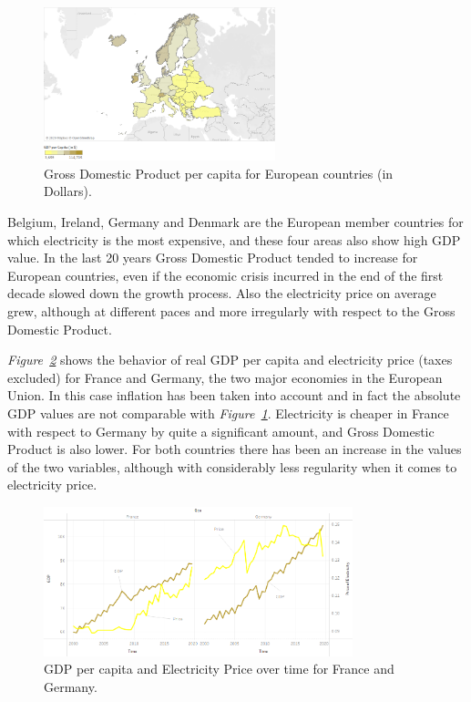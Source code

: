 \documentclass[a4paper,12pt]{book}
\begin{document}
\begin{figure}[tb]
\begin{center}
\captionsetup{justification=centering}
\includegraphics[width=0.6\textwidth]{Images/gdp.png}
\caption{Gross Domestic Product per capita for European countries (in Dollars).}
\label{fig:GDP}
\end{center}
\end{figure}

Belgium, Ireland, Germany and Denmark are the European member countries for which electricity is the most expensive, and these four areas also show high GDP value. In the last 20 years Gross Domestic Product tended to increase for European countries, even if the economic crisis incurred in the end of the first decade slowed down the growth process. Also the electricity price on average grew, although at different paces and more irregularly with respect to the Gross Domestic Product.

\textit{Figure~\ref{fig:pri-gdp}} shows the behavior of real GDP per capita and electricity price (taxes excluded) for France and Germany, the two major economies in the European Union.  In this case inflation has been taken into account and in fact the absolute GDP values are not comparable with \textit{Figure~\ref{fig:GDP}}. Electricity is cheaper in France with respect to Germany by quite a significant amount, and Gross Domestic Product is also lower. For both countries there has been an increase in the values of the two variables, although with considerably less regularity when it comes to electricity price.

\begin{figure}[tb]
\begin{center}
\captionsetup{justification=centering}
\includegraphics[width=0.8\textwidth]{Images/pri-gdp.png}
\caption{GDP per capita and Electricity Price over time for France and Germany.}
\label{fig:pri-gdp}
\end{center}
\end{figure}
\end{document}
